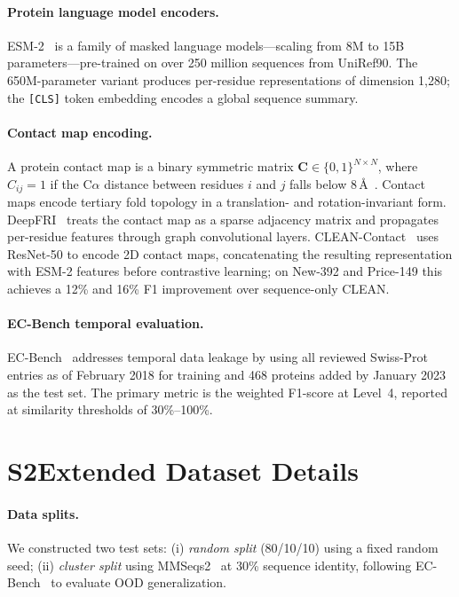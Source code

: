 \documentclass[11pt,a4paper]{article}
\begin{document}
\paragraph{Protein language model encoders.}
ESM-2~\citep{lin2023} is a family of masked language models---scaling from 8M to
15B parameters---pre-trained on over 250 million sequences from UniRef90.
The 650M-parameter variant produces per-residue representations of dimension
1,280; the \texttt{[CLS]} token embedding encodes a global sequence summary.

\paragraph{Contact map encoding.}
A protein contact map is a binary symmetric matrix
$\mathbf{C}\in\{0,1\}^{N\times N}$, where $C_{ij}=1$ if the C$\alpha$ distance
between residues $i$ and $j$ falls below 8\,\AA~\citep{gligorijevic2021}.
Contact maps encode tertiary fold topology in a translation- and
rotation-invariant form.
DeepFRI~\citep{gligorijevic2021} treats the contact map as a sparse adjacency
matrix and propagates per-residue features through graph convolutional layers.
CLEAN-Contact~\citep{ayres2024} uses ResNet-50 to encode 2D contact maps,
concatenating the resulting representation with ESM-2 features before
contrastive learning; on New-392 and Price-149 this achieves a 12\% and 16\%
F1 improvement over sequence-only CLEAN.

\paragraph{EC-Bench temporal evaluation.}
EC-Bench~\citep{davoudi2026} addresses temporal data leakage by using all
reviewed Swiss-Prot entries as of February 2018 for training and 468 proteins
added by January 2023 as the test set. The primary metric is the weighted
F1-score at Level~4, reported at similarity thresholds of 30\%--100\%.

\section*{S2\quad Extended Dataset Details}

\paragraph{Data splits.}
We constructed two test sets:
(i) \textit{random split} (80/10/10) using a fixed random seed;
(ii) \textit{cluster split} using MMSeqs2~\citep{steinegger2017} at 30\% sequence
identity, following EC-Bench~\citep{davoudi2026} to evaluate OOD generalization.
\end{document}
